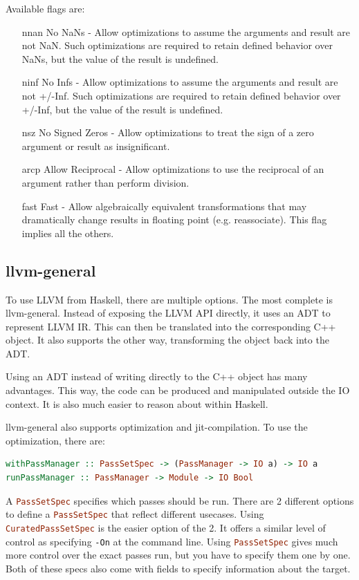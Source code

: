 \documentclass[a4paper,bibliography=totocnumbered,parskip,headsepline]{scrbook}
\begin{document}
Available flags are:
\begin{itemize}[noitemsep]
\item[nnan] No NaNs - Allow optimizations to assume the arguments and result are not NaN. Such optimizations are required to retain defined behavior over NaNs, but the value of the result is undefined.
\item[ninf] No Infs - Allow optimizations to assume the arguments and result are not +/-Inf. Such optimizations are required to retain defined behavior over +/-Inf, but the value of the result is undefined.
\item[nsz] No Signed Zeros - Allow optimizations to treat the sign of a zero argument or result as insignificant.
\item[arcp] Allow Reciprocal - Allow optimizations to use the reciprocal of an argument rather than perform division.
\item[fast] Fast - Allow algebraically equivalent transformations that may dramatically change results in floating point (e.g. reassociate). This flag implies all the others.
\end{itemize}

\subsection{llvm-general}
To use LLVM from Haskell, there are multiple options.
The most complete is llvm-general.\cite{scarlet2013llvm}
Instead of exposing the LLVM API directly, it uses an ADT to represent LLVM IR.
This can then be translated into the corresponding C++ object.
It also supports the other way, transforming the object back into the ADT.

Using an ADT instead of writing directly to the C++ object has many advantages.
This way, the code can be produced and manipulated outside the IO context.
It is also much easier to reason about within Haskell.

\newpage
llvm-general also supports optimization and jit-compilation.
To use the optimization, there are:
\begin{lstlisting}[language=haskell]
withPassManager :: PassSetSpec -> (PassManager -> IO a) -> IO a
runPassManager :: PassManager -> Module -> IO Bool
\end{lstlisting}
A \lstinline[language=haskell]!PassSetSpec! specifies which passes should be run.
There are 2 different options to define a \lstinline[language=haskell]!PassSetSpec! that reflect different usecases.
Using \lstinline[language=haskell]!CuratedPassSetSpec! is the easier option of the 2.
It offers a similar level of control as specifying \texttt{-On} at the command line.
Using \lstinline[language=haskell]!PassSetSpec! gives much more control over the exact passes run, but you have to specify them one by one.
Both of these specs also come with fields to specify information about the target.
\end{document}
